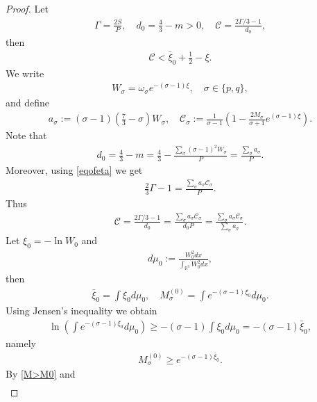 \documentclass{article}
\theoremstyle{definition} \theoremstyle{remark}
\numberwithin{equation}{section}
\newcommand{\R}{\mathbb{R}}
\begin{document}
\begin{proof}
\vskip0.12in
 Let
		\begin{align*}
			\Gamma = \frac{2S}{P}, \quad d_0 = \frac{4}{3} - m > 0, \quad \mathscr{C} = \frac{2\Gamma/3 - 1}{d_0},
		\end{align*}
		then
		\begin{align} \label{C<}
			\mathscr{C} < \bar\xi_0 + \frac{1}{2} - \xi.
		\end{align}
We write
		\begin{align*}
			W_\sigma = \omega_\sigma e^{-(\sigma-1)\xi}, \quad \sigma \in \{p,q\},
		\end{align*}
		and define
		\begin{align*}
			a_\sigma := (\sigma - 1)\left(\frac{7}{3} - \sigma\right)W_\sigma, \quad \mathscr{C}_\sigma := \frac{1}{\sigma-1}\left(1 - \frac{2M_\sigma}{\sigma + 1}e^{(\sigma - 1)\xi}\right).
		\end{align*}
		Note that
		\begin{align*}
			d_0 = \frac{4}{3} - m = \frac{4}{3} - \frac{\sum_\sigma(\sigma - 1)^2W_\sigma}{P} = \frac{\sum_\sigma a_\sigma}{P}.
		\end{align*}
		Moreover, using \eqref{eqofeta} we get
		\begin{align*}
			\frac{2}{3}\Gamma -1 = \frac{\sum_\sigma a_\sigma \mathscr{C}_\sigma}{P}.
		\end{align*}
		Thus
		\begin{align} \label{eqofscrC}
			\mathscr{C} = \frac{2\Gamma/3 - 1}{d_0} = \frac{\sum_\sigma a_\sigma \mathscr{C}_\sigma}{d_0P} = \frac{\sum_\sigma a_\sigma \mathscr{C}_\sigma}{\sum_\sigma a_\sigma}.
		\end{align}
Let $\xi_0 = - \ln W_0$ and
		\begin{align*}
			d\mu_0 := \frac{W_0^2dx}{\int_{\R^5}W_0^2dx},
		\end{align*}
		then
		\begin{align*}
			\bar\xi_0 = \int \xi_0 d\mu_0, \quad M_\sigma^{(0)} = \int e^{-(\sigma - 1)\xi_0}d\mu_0.
		\end{align*}
		Using Jensen's inequality we obtain
		\begin{align*}
			\ln\left(\int e^{-(\sigma - 1)\xi_0}d\mu_0\right) \ge -(\sigma - 1)\int \xi_0d\mu_0 = -(\sigma - 1)\bar \xi_0,
		\end{align*}
		namely
		\begin{align*}
			M_\sigma^{(0)} \ge e^{-(\sigma - 1)\bar \xi_0}.
		\end{align*}
		By \eqref{M>M0} and
		\begin{align*}

\end{align*}
\end{proof}
\end{document}
